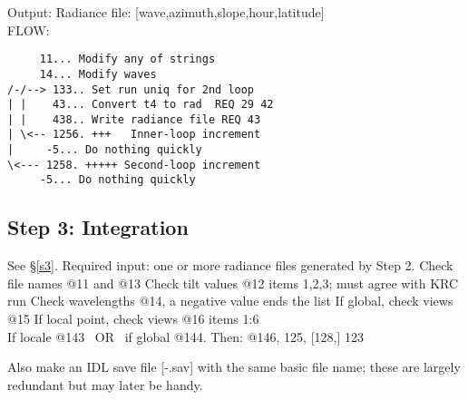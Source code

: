 \documentclass{article}
\begin{document}
Output:  Radiance file: [wave,azimuth,slope,hour,latitude]
\\ FLOW:
\vspace{-3.mm} 
\begin{verbatim}
     11... Modify any of strings
     14... Modify waves
/-/--> 133.. Set run uniq for 2nd loop
| |    43... Convert t4 to rad  REQ 29 42
| |    438.. Write radiance file REQ 43
| \<-- 1256. +++   Inner-loop increment
|     -5... Do nothing quickly
\<--- 1258. +++++ Second-loop increment
     -5... Do nothing quickly
\end{verbatim} 

\subsection{Step 3: Integration}
See \S \ref{s3}. Required input: one or more radiance files generated by Step 2.
\qi Check file names @11 and @13
\qi Check tilt values @12 items 1,2,3; must agree with KRC run
\qi Check wavelengths @14, a negative value ends the list
\qi If global, check views @15
\qi If local point, check views @16 items 1:6 
\\ If locale @143 \  OR \ if global @144.  Then:  @146, 125, [128,] 123

Also make an IDL save file [-.sav] with the same basic file name; these are
largely redundant but may later be handy.
 
\end{document}
